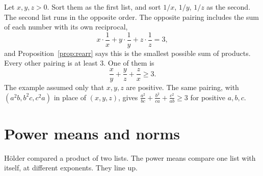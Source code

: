 \begin{examplex}
Let $x,y,z>0$. Sort them as the first list, and sort $1/x$, $1/y$, $1/z$ as the second. The second list runs in the opposite order. The opposite pairing includes the sum of each number with its own reciprocal,
\[
x\cdot\frac1x+y\cdot\frac1y+z\cdot\frac1z=3,
\]
and Proposition~\ref{prop:rearr} says this is the smallest possible sum of products. Every other pairing is at least $3$. One of them is
\[
\frac xy+\frac yz+\frac zx\ge3.
\]
The example assumed only that $x,y,z$ are positive. The same pairing, with $(a^2b,b^2c,c^2a)$ in place of $(x,y,z)$, gives $\frac{a^2}{bc}+\frac{b^2}{ca}+\frac{c^2}{ab}\ge3$ for positive $a,b,c$.
\end{examplex}

\section{Power means and norms}\label{sec:means}

H\"older compared a product of two lists. The power means compare one list with itself, at different exponents. They line up.

